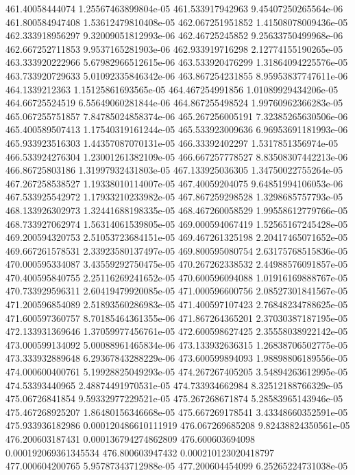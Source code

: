 {461.40058444074 1.25567463899804e-05
461.533917942963 9.45407250265564e-06
461.800584947408 1.53612479810408e-05
462.067251951852 1.41508078009436e-05
462.333918956297 9.32009051812993e-06
462.46725245852 9.25633750499968e-06
462.667252711853 9.9537165281903e-06
462.933919716298 2.12774155190265e-05
463.333920222966 5.67982966512615e-06
463.533920476299 1.31864094225576e-05
463.733920729633 5.01092335846342e-06
463.867254231855 8.95953837747611e-06
464.1339212363 1.15125861693565e-05
464.467254991856 1.01089929434206e-05
464.66725524519 6.55649060281844e-06
464.867255498524 1.99760962366283e-05
465.067255751857 7.84785024858374e-06
465.267256005191 7.32385265630506e-06
465.400589507413 1.17540319161244e-05
465.533923009636 6.96953691181993e-06
465.933923516303 1.44357087070131e-05
466.33392402297 1.5317851356974e-05
466.533924276304 1.23001261382109e-05
466.667257778527 8.83508307442213e-06
466.86725803186 1.31997932431803e-05
467.133925036305 1.34750022755264e-05
467.267258538527 1.19338010114007e-05
467.40059204075 9.64851994106053e-06
467.533925542972 1.17933210233982e-05
467.867259298528 1.3298685757793e-05
468.133926302973 1.32441688198335e-05
468.467260058529 1.99558612779766e-05
468.733927062974 1.56314061539805e-05
469.000594067419 1.52565167245428e-05
469.200594320753 2.51053723684151e-05
469.467261325198 2.20417465071652e-05
469.667261578531 2.33923580137497e-05
469.800595080754 2.63175768515836e-05
470.000595334087 3.43559292750475e-05
470.267262338532 2.44988576091857e-05
470.400595840755 2.25116269241652e-05
470.600596094088 1.01916169888767e-05
470.733929596311 2.60419479920085e-05
471.000596600756 2.08527301841567e-05
471.200596854089 2.51893560286983e-05
471.400597107423 2.76848234788625e-05
471.600597360757 8.70185464361355e-06
471.867264365201 2.37030387187195e-05
472.133931369646 1.37059977456761e-05
472.600598627425 2.35558038922142e-05
473.000599134092 5.00088961465834e-06
473.133932636315 1.26838706502775e-05
473.333932889648 6.29367843288229e-06
473.600599894093 1.98898806189556e-05
474.000600400761 5.19928825049293e-05
474.267267405205 3.54894263612995e-05
474.53393440965 2.48874491970531e-05
474.733934662984 8.32512188766329e-05
475.06726841854 9.59332977229521e-05
475.267268671874 5.28583965143946e-05
475.467268925207 1.86480156346668e-05
475.667269178541 3.43348660352591e-05
475.933936182986 0.000120486610111919
476.067269685208 9.82438824350561e-05
476.200603187431 0.000136794274862809
476.600603694098 0.000192069361345534
476.800603947432 0.000210123020418797
477.000604200765 5.95787343712988e-05
477.200604454099 6.25265224731038e-05
}
